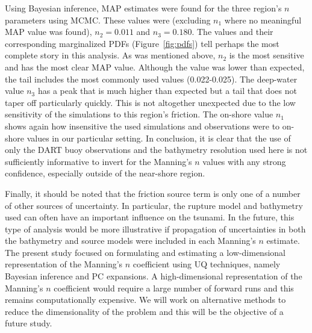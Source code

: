 Using Bayesian inference, MAP estimates were found for the three region's $n$
parameters using MCMC.  These values were (excluding $n_1$ where no meaningful
MAP value was found), $n_2=0.011$ and $n_3=0.180$.  The values and their
corresponding marginalized PDFs (Figure~\ref{fig:pdfs}) tell perhaps the most
complete story in this analysis.  As was mentioned above, $n_2$ is the most
sensitive and has the most clear MAP value.  Although the value was lower than
expected, the tail includes the most commonly used values (0.022-0.025).  The
deep-water value $n_3$ has a peak that is much higher than expected but a tail
that does not taper off particularly quickly.  This is not altogether unexpected
due to the low sensitivity of the simulations to this region's friction.  The
on-shore value $n_1$ shows again how insensitive the used simulations and
observations were to on-shore values in our particular setting.  
In conclusion, it is clear that the use of only the DART buoy observations and the 
bathymetry resolution used here is not sufficiently informative to invert for the 
Manning's $n$ values with any strong confidence, especially outside of the near-shore region.

Finally, it should be noted that the friction source term is only one of a
number of other sources of uncertainty.  In particular, the rupture model and
bathymetry used can often have an important influence on the tsunami.  
In the future, this type of analysis would be more illustrative if
propagation of uncertainties in both the bathymetry and source models were
included in each Manning's $n$ estimate.  The
present study focused on formulating and estimating a low-dimensional
representation of the Manning's $n$ coefficient using UQ techniques, namely
Bayesian inference and PC expansions.  A high-dimensional representation of the
Manning's $n$ coefficient would require a large number of forward runs and this remains
computationally expensive.  We will work on alternative methods to reduce the
dimensionality of the problem and this will be the objective of a future study.
